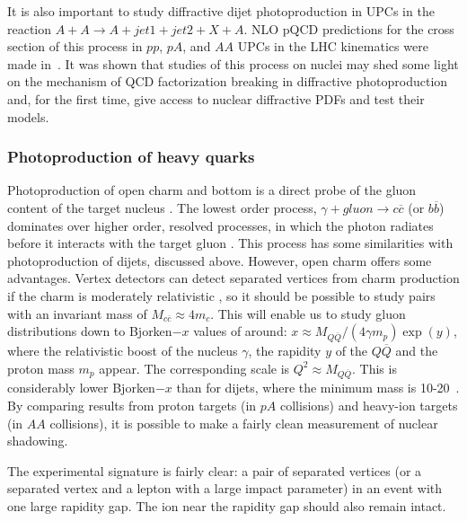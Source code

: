 \documentclass[../report.tex]{subfiles}
\begin{document}
It is also important to study diffractive dijet photoproduction
in UPCs in the reaction $A + A \to A + jet1 +
jet2 + X + A$. NLO pQCD predictions for the cross section of this process in $pp$, $pA$, and $AA$ UPCs in the LHC kinematics were made in~\cite{Guzey:2016tek}. It was shown that studies of this process on nuclei may shed some light on the mechanism of QCD factorization breaking in diffractive photoproduction and, for the first time, give access to nuclear diffractive PDFs and test their models. 



\subsubsection{Photoproduction of heavy quarks}
\label{sec:upchqdijets}

Photoproduction of open charm and bottom is a direct probe of the gluon content of the target nucleus \cite{Klein:2002wm,Goncalves:2017zdx}.  The lowest order process, $\gamma + gluon\rightarrow c \overline c$ (or $b \overline b$) dominates over higher order, resolved processes, in which the photon radiates before it interacts with the target gluon \cite{Klein:2002wm}.  This process has some similarities with photoproduction of dijets, discussed above.  However, open charm offers some advantages.  Vertex detectors can detect separated vertices from charm production if the charm is moderately relativistic \cite{Bala:2012vg}, so it should be possible to study pairs with an invariant mass of $M_{c\overline c} \approx 4m_c$.  This will enable us to study gluon distributions down to Bjorken$-x$ values of around: $x \approx M_{Q\overline Q}/(4\gamma m_p) \exp(y)$, where the relativistic boost of the nucleus $\gamma$, the rapidity $y$ of the $Q\overline Q$ and the proton mass $m_p$ appear. The corresponding scale is $Q^2 \approx M_{Q\overline Q}$.  This is considerably lower Bjorken$-x$ than for dijets, where the minimum mass is 10-20~\UGeVcc.  By comparing results from proton targets (in $pA$ collisions) and heavy-ion targets (in $AA$ collisions), it is possible to make a fairly clean measurement of nuclear shadowing.  

The experimental signature is fairly clear: a pair of separated vertices (or a separated vertex and a lepton with a large impact parameter) in an event with one large rapidity gap. The ion near the rapidity gap should also remain intact. 
\end{document}
